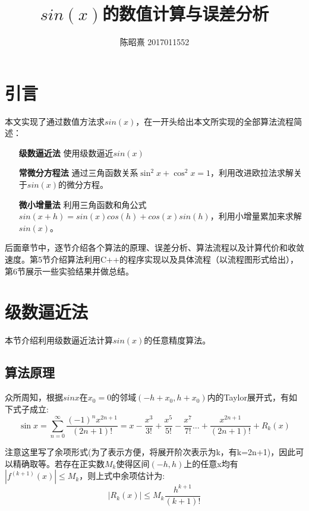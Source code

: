 \documentclass[UTF8]{ctexart}
\begin{document}
\title{$sin(x)$的数值计算与误差分析}
\author{陈昭熹 2017011552}
\maketitle
\tableofcontents
\newpage

\section{引言}
本文实现了通过数值方法求$sin(x)$，在一开头给出本文所实现的全部算法流程简述：
\begin{itemize}
    \item[\textbf{级数逼近法}] 使用级数逼近$sin(x)$
    \item[\textbf{常微分方程法}]通过三角函数关系$\sin^2{x}+\cos^2{x}=1$，利用改进欧拉法求解关于$sin(x)$的微分方程。
    \item[\textbf{微小增量法}] 利用三角函数和角公式$sin(x+h)=sin(x)cos(h)+cos(x)sin(h)$，利用小增量累加来求解$sin(x)$。
\end{itemize}

后面章节中，逐节介绍各个算法的原理、误差分析、算法流程以及计算代价和收敛速度。第5节介绍算法利用C++的程序实现以及具体流程（以流程图形式给出），第6节展示一些实验结果并做总结。

\section{级数逼近法}

本节介绍利用级数逼近法计算$sin(x)$的任意精度算法。

\subsection{算法原理}

众所周知，根据$sinx$在$x_0=0$的邻域$(-h+x_0,h+x_0)$内的Taylor展开式，有如下式子成立:
\begin{equation}
    \sin{x} = \sum^\infty_{n=0} \frac{(-1)^nx^{2n+1}}{(2n+1)!}=x-\frac{x^3}{3!}+\frac{x^5}{5!}-\frac{x^7}{7!} \dots + \frac{x^{2n+1}}{(2n+1)!}+R_k(x)
\end{equation}

注意这里写了余项形式(为了表示方便，将展开阶次表示为k，有k=2n+1)，因此可以精确取等。若存在正实数$M_k$使得区间$(-h,h)$上的任意x均有$|f^{(k+1)}(x)|\leq M_k$，则上式中余项估计为:
\begin{equation}
    |R_k(x)|\leq M_k \frac{h^{k+1}}{(k+1)!}
\end{equation}
\end{document}
